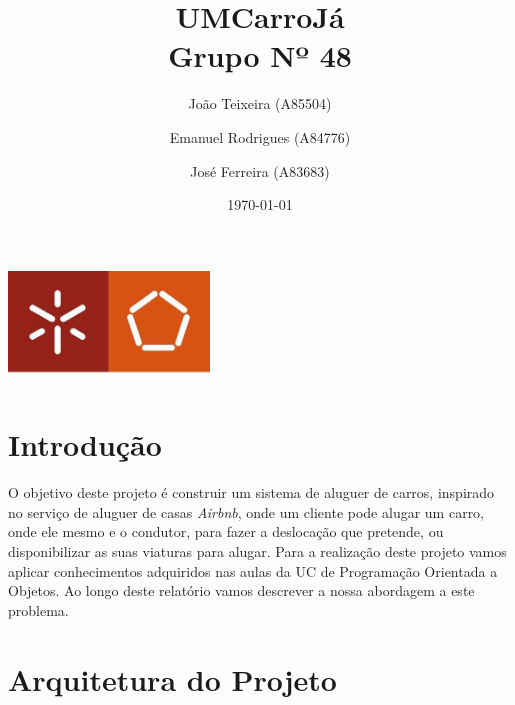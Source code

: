 \documentclass[a4paper]{report}
\begin{document}
\title{UMCarroJá\\ 
\large Grupo Nº 48}
\author{João Teixeira (A85504) \and Emanuel Rodrigues (A84776) \and José Ferreira (A83683)}
\date{\today}

\begin{center}
    \begin{minipage}{0.75\linewidth}
        \centering
        \includegraphics[width=0.4\textwidth]{eng.jpeg}\par\vspace{1cm}
        \vspace{1.5cm}
        \href{https://www.uminho.pt/PT}
        {\color{black}{\scshape\LARGE Universidade do Minho}} \par
        \vspace{1cm}
        {\color{black}{\scshape\Large Programação Orientada a Objetos}} \par
        \vspace{1.5cm}
        \maketitle
    \end{minipage}
\end{center}

\tableofcontents

\pagebreak

\chapter{Introdução}

O objetivo deste projeto é construir um sistema de aluguer de carros,
inspirado no serviço de aluguer de casas \textit{Airbnb}, onde um cliente
pode alugar um carro, onde ele mesmo e o condutor, para fazer a deslocação
que pretende, ou disponibilizar as suas viaturas para alugar.
Para a realização deste projeto vamos aplicar conhecimentos adquiridos nas
aulas da UC de Programação Orientada a Objetos.
Ao longo deste relatório vamos descrever a nossa abordagem a este problema.


\chapter{Arquitetura do Projeto}
\end{document}
